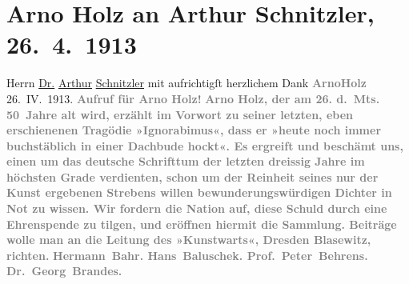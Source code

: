                \section[Arno Holz an Arthur Schnitzler, 26. 4. 1913]{ Arno Holz an Arthur Schnitzler, 26. 4. 1913}\nopagebreak{}\rehead{ }\begin{ledgroupsized}[t]{13cm}\normalsize\beginnumbering \toendnotes[C]{\smallbreak\pagebreak[2]} 
\pstart
           \noindent{}{\pb}Herrn\pend
           \pstart
           \uline{Dr.}{ }\uline{Arthur}{ }\uline{Schnitzler}\pend
           \pstart
           mit aufrichtigſt herzlichem Dank\pend
           \pstart
           \centering{}\textcolor{gray}{\textbf{ArnoHolz}}\pend
           \pstart
           \noindent{}\centering{}26. IV. 1913.\pend
           \pstart
           \noindent{}\centering{}{\pb}\textcolor{gray}{\textbf{Aufruf für Arno Holz!}}\pend
           \pstart
           \noindent{}\textcolor{gray}{\textbf{Arno Holz, der am 26. d. Mts. 50 Jahre alt
                        wird, erzählt im Vorwort zu seiner letzten, eben erschienenen Tragödie »Ignorabimus«, dass er »heute noch immer
                        buchstäblich in einer Dachbude hockt«. Es ergreift und beschämt uns, einen
                        um das deutsche Schrifttum der letzten dreissig Jahre im höchsten Grade
                        verdienten, schon um der Reinheit seines nur der Kunst ergebenen Strebens
                        willen bewunderungswürdigen Dichter in Not zu wissen. Wir fordern die Nation
                        auf, diese Schuld durch eine Ehrenspende zu tilgen, und eröffnen hiermit die
                        Sammlung. Beiträge wolle man an die Leitung des »Kunstwarts«, Dresden Blasewitz,
                        richten.}}\pend
           \pstart
           \centering{}\textcolor{gray}{\textbf{\textbf{Hermann Bahr. Hans Baluschek. Prof. Peter Behrens.}{ }\textbf{Dr. Georg Brandes.
}}}
\end{ledgroupsized}
